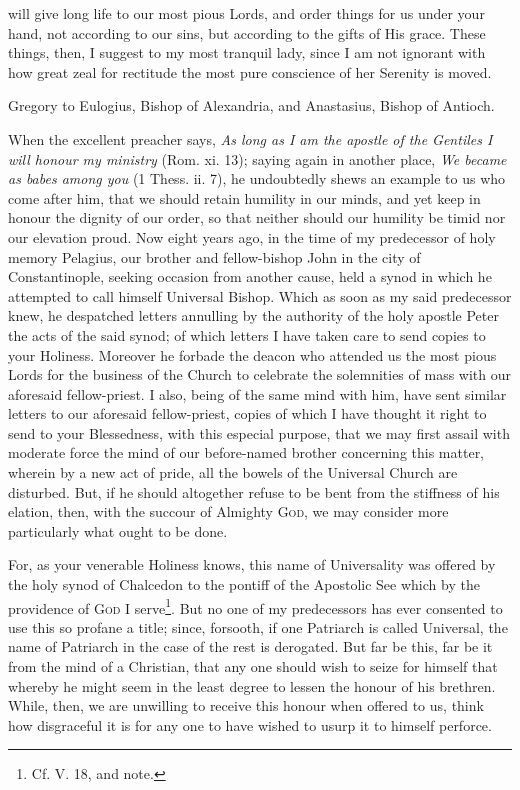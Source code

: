 will give long life to our most pious Lords, and order things for us under your hand, not according to our sins, but according to the gifts of His grace. These things, then, I suggest to my most tranquil lady, since I am not ignorant with how great zeal for rectitude the most pure conscience of her Serenity is moved.


Gregory to Eulogius, Bishop of Alexandria, and Anastasius, Bishop of Antioch.

When the excellent preacher says, \emph{As long as I am the apostle of the Gentiles I will honour my ministry} (Rom. xi. 13); saying again in another place, \emph{We became as babes among you} (1 Thess. ii. 7), he undoubtedly shews an example to us who come after him, that we should retain humility in our minds, and yet keep in honour the dignity of our order, so that neither should our humility be timid nor our elevation proud. Now eight years ago, in the time of my predecessor of holy memory Pelagius, our brother and fellow-bishop John in the city of Constantinople, seeking occasion from another cause, held a synod in which he attempted to call himself Universal Bishop. Which as soon as my said predecessor knew, he despatched letters annulling by the authority of the holy apostle Peter the acts of the said synod; of which letters I have taken care to send copies to your Holiness. Moreover he forbade the deacon who attended us the most pious Lords for the business of the Church to celebrate the solemnities of mass with our aforesaid fellow-priest. I also, being of the same mind with him, have sent similar letters to our aforesaid fellow-priest, copies of which I have thought it right to send to your Blessedness, with this especial purpose, that we may first assail with moderate force the mind of our before-named brother concerning this matter, wherein by a new act of pride, all the bowels of the Universal Church are disturbed. But, if he should altogether refuse to be bent from the stiffness of his elation, then, with the succour of Almighty \textsc{God}, we may consider more particularly what ought to be done.

For, as your venerable Holiness knows, this name of Universality was offered by the holy synod of Chalcedon to the pontiff of the Apostolic See which by the providence of \textsc{God} I serve\footnote{Cf. V. 18, and note.}. But no one of my predecessors has ever consented to use this so profane a title; since, forsooth, if one Patriarch is called Universal, the name of Patriarch in the case of the rest is derogated. But far be this, far be it from the mind of a Christian, that any one should wish to seize for himself that whereby he might seem in the least degree to lessen the honour of his brethren. While, then, we are unwilling to receive this honour when offered to us, think how disgraceful it is for any one to have wished to usurp it to himself perforce.

